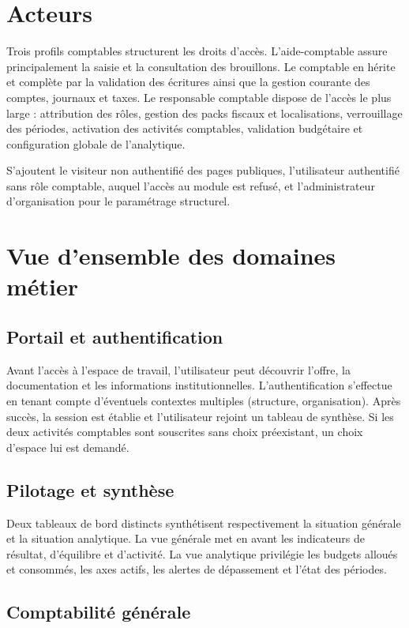 \documentclass[12pt,a4paper]{report}
\begin{document}
\section{Acteurs}

Trois profils comptables structurent les droits d'accès. L'aide-comptable assure principalement la saisie et la consultation des brouillons. Le comptable en hérite et complète par la validation des écritures ainsi que la gestion courante des comptes, journaux et taxes. Le responsable comptable dispose de l'accès le plus large : attribution des rôles, gestion des packs fiscaux et localisations, verrouillage des périodes, activation des activités comptables, validation budgétaire et configuration globale de l'analytique.

S'ajoutent le visiteur non authentifié des pages publiques, l'utilisateur authentifié sans rôle comptable, auquel l'accès au module est refusé, et l'administrateur d'organisation pour le paramétrage structurel.

\section{Vue d'ensemble des domaines métier}

\subsection{Portail et authentification}

Avant l'accès à l'espace de travail, l'utilisateur peut découvrir l'offre, la documentation et les informations institutionnelles. L'authentification s'effectue en tenant compte d'éventuels contextes multiples (structure, organisation). Après succès, la session est établie et l'utilisateur rejoint un tableau de synthèse. Si les deux activités comptables sont souscrites sans choix préexistant, un choix d'espace lui est demandé.

\subsection{Pilotage et synthèse}

Deux tableaux de bord distincts synthétisent respectivement la situation générale et la situation analytique. La vue générale met en avant les indicateurs de résultat, d'équilibre et d'activité. La vue analytique privilégie les budgets alloués et consommés, les axes actifs, les alertes de dépassement et l'état des périodes.

\subsection{Comptabilité générale}
\end{document}
